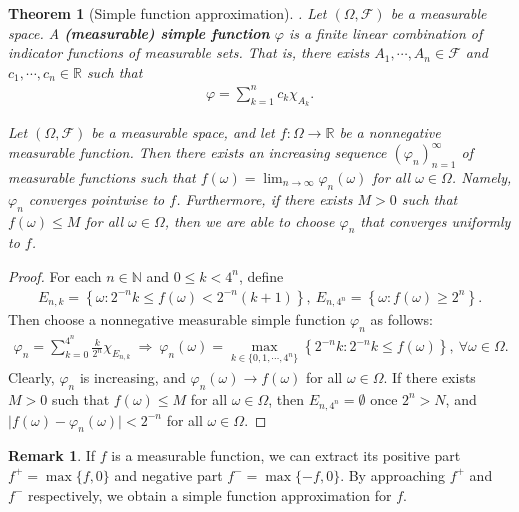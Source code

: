 \documentclass{article}
\numberwithin{equation}{section}
\theoremstyle{plain}
\newtheorem{theorem}{Theorem}[section]
\theoremstyle{definition}
\newtheorem*{remark}{Remark}
\begin{document}
\begin{theorem}[Simple function approximation]\label{thm:1.36}. Let $(\Omega,\mathscr{F})$ be a measurable space. A \textbf{(measurable) simple function} $\varphi$ is a finite linear combination of indicator functions of measurable sets. That is, there exists $A_1,\cdots,A_n\in\mathscr{F}$ and $c_1,\cdots,c_n\in\mathbb{R}$ such that
\begin{align*}
	\varphi = \sum_{k=1}^n c_k\chi_{A_k}. \tag{1.5}\label{eq:1.5}
\end{align*}

Let $(\Omega,\mathscr{F})$ be a measurable space, and let $f:\Omega\to\mathbb{R}$ be a nonnegative measurable function. Then there exists an increasing sequence $(\varphi_n)_{n=1}^\infty$ of measurable functions such that $f(\omega)=\lim_{n\to\infty}\varphi_n(\omega)$ for all $\omega\in\Omega$. Namely, $\varphi_n$ converges pointwise to $f$. Furthermore, if there exists $M>0$ such that $f(\omega)\leq M$ for all $\omega\in\Omega$, then we are able to choose $\varphi_n$ that converges uniformly to $f$.
\end{theorem}
\begin{proof}
For each $n\in\mathbb{N}$ and $0\leq k< 4^n$, define
\begin{align*}
	E_{n,k} = \left\{\omega:2^{-n}k\leq f(\omega) < 2^{-n}(k+1)\right\},\ E_{n,4^n}=\left\{\omega:f(\omega)\geq 2^n\right\}.
\end{align*}
Then choose a nonnegative measurable simple function $\varphi_n$ as follows:
\begin{align*}
	\varphi_n=\sum_{k=0}^{4^n}\frac{k}{2^n}\chi_{E_{n,k}}\ \Rightarrow\ \varphi_n(\omega) = \max_{k\in\{0,1,\cdots,4^n\}}\left\{2^{-n}k:2^{-n}k\leq f(\omega)\right\},\ \forall\omega\in\Omega.
\end{align*}
Clearly, $\varphi_n$ is increasing, and $\varphi_n(\omega)\to f(\omega)$ for all $\omega\in\Omega$. If there exists $M>0$ such that $f(\omega)\leq M$ for all $\omega\in\Omega$, then $E_{n,4^n}=\emptyset$ once $2^n> N$, and $\vert f(\omega)-\varphi_n(\omega)\vert < 2^{-n}$ for all $\omega\in\Omega$.
\end{proof}

\begin{remark} If $f$ is a measurable function, we can extract its positive part $f^+=\max\{f,0\}$ and negative part $f^-=\max\{-f,0\}$. By approaching $f^+$ and $f^-$ respectively, we obtain a simple function approximation for $f$.
\end{remark}
\end{document}
